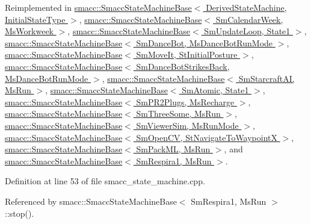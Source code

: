 Reimplemented in \hyperlink{structsmacc_1_1SmaccStateMachineBase_aaa9baa888888165998aa990ca299e30b}{smacc\+::\+Smacc\+State\+Machine\+Base$<$ Derived\+State\+Machine, Initial\+State\+Type $>$}, \hyperlink{structsmacc_1_1SmaccStateMachineBase_aaa9baa888888165998aa990ca299e30b}{smacc\+::\+Smacc\+State\+Machine\+Base$<$ Sm\+Calendar\+Week, Ms\+Workweek $>$}, \hyperlink{structsmacc_1_1SmaccStateMachineBase_aaa9baa888888165998aa990ca299e30b}{smacc\+::\+Smacc\+State\+Machine\+Base$<$ Sm\+Update\+Loop, State1 $>$}, \hyperlink{structsmacc_1_1SmaccStateMachineBase_aaa9baa888888165998aa990ca299e30b}{smacc\+::\+Smacc\+State\+Machine\+Base$<$ Sm\+Dance\+Bot, Ms\+Dance\+Bot\+Run\+Mode $>$}, \hyperlink{structsmacc_1_1SmaccStateMachineBase_aaa9baa888888165998aa990ca299e30b}{smacc\+::\+Smacc\+State\+Machine\+Base$<$ Sm\+Move\+It, St\+Initial\+Posture $>$}, \hyperlink{structsmacc_1_1SmaccStateMachineBase_aaa9baa888888165998aa990ca299e30b}{smacc\+::\+Smacc\+State\+Machine\+Base$<$ Sm\+Dance\+Bot\+Strikes\+Back, Ms\+Dance\+Bot\+Run\+Mode $>$}, \hyperlink{structsmacc_1_1SmaccStateMachineBase_aaa9baa888888165998aa990ca299e30b}{smacc\+::\+Smacc\+State\+Machine\+Base$<$ Sm\+Starcraft\+A\+I, Ms\+Run $>$}, \hyperlink{structsmacc_1_1SmaccStateMachineBase_aaa9baa888888165998aa990ca299e30b}{smacc\+::\+Smacc\+State\+Machine\+Base$<$ Sm\+Atomic, State1 $>$}, \hyperlink{structsmacc_1_1SmaccStateMachineBase_aaa9baa888888165998aa990ca299e30b}{smacc\+::\+Smacc\+State\+Machine\+Base$<$ Sm\+P\+R2\+Plugs, Ms\+Recharge $>$}, \hyperlink{structsmacc_1_1SmaccStateMachineBase_aaa9baa888888165998aa990ca299e30b}{smacc\+::\+Smacc\+State\+Machine\+Base$<$ Sm\+Three\+Some, Ms\+Run $>$}, \hyperlink{structsmacc_1_1SmaccStateMachineBase_aaa9baa888888165998aa990ca299e30b}{smacc\+::\+Smacc\+State\+Machine\+Base$<$ Sm\+Viewer\+Sim, Ms\+Run\+Mode $>$}, \hyperlink{structsmacc_1_1SmaccStateMachineBase_aaa9baa888888165998aa990ca299e30b}{smacc\+::\+Smacc\+State\+Machine\+Base$<$ Sm\+Open\+C\+V, St\+Navigate\+To\+Waypoint\+X $>$}, \hyperlink{structsmacc_1_1SmaccStateMachineBase_aaa9baa888888165998aa990ca299e30b}{smacc\+::\+Smacc\+State\+Machine\+Base$<$ Sm\+Pack\+M\+L, Ms\+Run $>$}, and \hyperlink{structsmacc_1_1SmaccStateMachineBase_aaa9baa888888165998aa990ca299e30b}{smacc\+::\+Smacc\+State\+Machine\+Base$<$ Sm\+Respira1, Ms\+Run $>$}.



Definition at line 53 of file smacc\+\_\+state\+\_\+machine.\+cpp.



Referenced by smacc\+::\+Smacc\+State\+Machine\+Base$<$ Sm\+Respira1, Ms\+Run $>$\+::stop().


